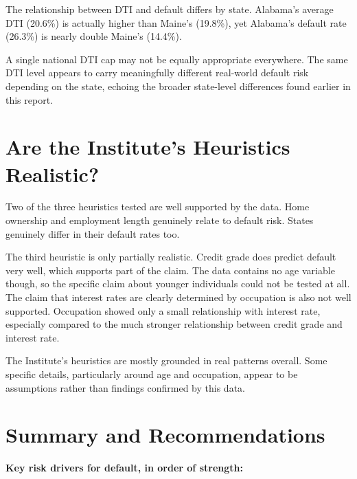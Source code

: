 \documentclass[11pt,preprint]{elsarticle}
\numberwithin{equation}{section}
\numberwithin{figure}{section}
\numberwithin{table}{section}
\begin{document}
The relationship between DTI and default differs by state. Alabama's
average DTI (20.6\%) is actually higher than Maine's (19.8\%), yet
Alabama's default rate (26.3\%) is nearly double Maine's (14.4\%).

A single national DTI cap may not be equally appropriate everywhere. The
same DTI level appears to carry meaningfully different real-world
default risk depending on the state, echoing the broader state-level
differences found earlier in this report.

\section{Are the Institute's Heuristics
Realistic?}\label{are-the-institutes-heuristics-realistic}

Two of the three heuristics tested are well supported by the data. Home
ownership and employment length genuinely relate to default risk. States
genuinely differ in their default rates too.

The third heuristic is only partially realistic. Credit grade does
predict default very well, which supports part of the claim. The data
contains no age variable though, so the specific claim about younger
individuals could not be tested at all. The claim that interest rates
are clearly determined by occupation is also not well supported.
Occupation showed only a small relationship with interest rate,
especially compared to the much stronger relationship between credit
grade and interest rate.

The Institute's heuristics are mostly grounded in real patterns overall.
Some specific details, particularly around age and occupation, appear to
be assumptions rather than findings confirmed by this data.

\section{Summary and Recommendations}\label{summary-and-recommendations}

\textbf{Key risk drivers for default, in order of strength:}
\end{document}
